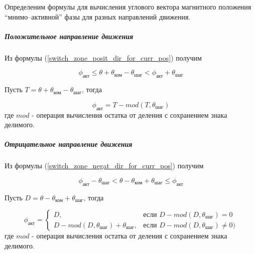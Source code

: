 Определеним формулы для вычисления углового вектора магнитного положения
``мнимо--активной'' фазы для разных направлений движения.

\subparagraph{Положительное направление движения}

Из формулы (\ref{switch_zone_posit_dir_for_curr_pos}) получим

\begin{equation}
    \label{sync_restore_posit_dir_active_pole_pos_conditions}
    \phi_\textit{акт}
    \leq \theta + \theta_\textit{ком} - \theta_\textit{шаг}
    < \phi_\textit{акт} + \theta_\textit{шаг}
\end{equation}

Пусть $T = \theta + \theta_\textit{ком} - \theta_\textit{шаг}$, тогда

\begin{equation}
    \label{sync_restore_posit_dir_active_pole_pos}
    \phi_\textit{акт} = T - mod(T, \theta_\textit{шаг})
\end{equation}
где $mod$ - операция вычисления остатка от деления с сохранением знака делимого.

\subparagraph{Отрицательное направление движения}
Из формулы (\ref{switch_zone_negat_dir_for_curr_pos}) получим

\begin{equation}
    \label{sync_restore_negat_dir_active_pole_pos_conditions}
    \phi_\textit{акт} - \theta_\textit{шаг}
    < \theta - \theta_\textit{ком} + \theta_\textit{шаг}
    \leq \phi_\textit{акт}
\end{equation}

Пусть $D = \theta - \theta_\textit{ком} + \theta_\textit{шаг}$, тогда

\begin{equation}
    \label{sync_restore_negat_dir_active_pole_pos}
    \phi_\textit{акт} =
        \begin{cases}
            D,                                                      & \mbox{если } D - mod(D, \theta_\textit{шаг}) = 0 \\
            D - mod(D, \theta_\textit{шаг}) + \theta_\textit{шаг},  & \mbox{если } D - mod(D, \theta_\textit{шаг}) \ne 0)
        \end{cases}
\end{equation}
где $mod$ - операция вычисления остатка от деления с сохранением знака делимого.
